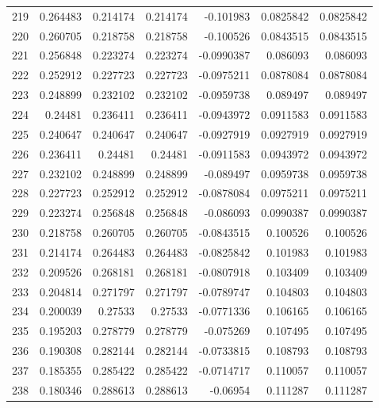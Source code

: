 \begin{tabular}{rrrrrrr}
 219 &  0.264483    & 0.214174    & 0.214174    & -0.101983    & 0.0825842   & 0.0825842   \\
 220 &  0.260705    & 0.218758    & 0.218758    & -0.100526    & 0.0843515   & 0.0843515   \\
 221 &  0.256848    & 0.223274    & 0.223274    & -0.0990387   & 0.086093    & 0.086093    \\
 222 &  0.252912    & 0.227723    & 0.227723    & -0.0975211   & 0.0878084   & 0.0878084   \\
 223 &  0.248899    & 0.232102    & 0.232102    & -0.0959738   & 0.089497    & 0.089497    \\
 224 &  0.24481     & 0.236411    & 0.236411    & -0.0943972   & 0.0911583   & 0.0911583   \\
 225 &  0.240647    & 0.240647    & 0.240647    & -0.0927919   & 0.0927919   & 0.0927919   \\
 226 &  0.236411    & 0.24481     & 0.24481     & -0.0911583   & 0.0943972   & 0.0943972   \\
 227 &  0.232102    & 0.248899    & 0.248899    & -0.089497    & 0.0959738   & 0.0959738   \\
 228 &  0.227723    & 0.252912    & 0.252912    & -0.0878084   & 0.0975211   & 0.0975211   \\
 229 &  0.223274    & 0.256848    & 0.256848    & -0.086093    & 0.0990387   & 0.0990387   \\
 230 &  0.218758    & 0.260705    & 0.260705    & -0.0843515   & 0.100526    & 0.100526    \\
 231 &  0.214174    & 0.264483    & 0.264483    & -0.0825842   & 0.101983    & 0.101983    \\
 232 &  0.209526    & 0.268181    & 0.268181    & -0.0807918   & 0.103409    & 0.103409    \\
 233 &  0.204814    & 0.271797    & 0.271797    & -0.0789747   & 0.104803    & 0.104803    \\
 234 &  0.200039    & 0.27533     & 0.27533     & -0.0771336   & 0.106165    & 0.106165    \\
 235 &  0.195203    & 0.278779    & 0.278779    & -0.075269    & 0.107495    & 0.107495    \\
 236 &  0.190308    & 0.282144    & 0.282144    & -0.0733815   & 0.108793    & 0.108793    \\
 237 &  0.185355    & 0.285422    & 0.285422    & -0.0714717   & 0.110057    & 0.110057    \\
 238 &  0.180346    & 0.288613    & 0.288613    & -0.06954     & 0.111287    & 0.111287    \\

\end{tabular}
